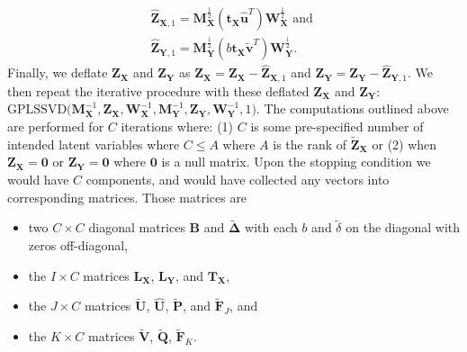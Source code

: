 \documentclass[12pt]{article}
\begin{document}
\begin{equation}
\begin{aligned}
\widehat{\mathbf Z}_{{\mathbf X},1} = {\mathbf M}_{\mathbf X}^{\frac{1}{2}}({\mathbf t}_{\mathbf X}\widehat{\mathbf u}^{T}){\mathbf W}_{\mathbf X}^{\frac{1}{2}} \text{ and } \\
\widehat{\mathbf Z}_{{\mathbf Y},1} = {\mathbf M}_{\mathbf Y}^{\frac{1}{2}}(b{\mathbf t}_{\mathbf X}\widetilde{\mathbf v}^{T}){\mathbf W}_{\mathbf Y}^{\frac{1}{2}}.
\label{eq:rank1_preds_plscar}
\end{aligned}
\end{equation} Finally, we deflate \({\mathbf Z}_{\mathbf X}\) and
\({\mathbf Z}_{\mathbf Y}\) as
\({\mathbf Z}_{\mathbf X} = {\mathbf Z}_{\mathbf X} - \widehat{\mathbf Z}_{{\mathbf X},1}\)
and
\({\mathbf Z}_{\mathbf Y} = {\mathbf Z}_{\mathbf Y} - \widehat{\mathbf Z}_{{\mathbf Y},1}\).
We then repeat the iterative procedure with these deflated
\({\mathbf Z}_{\mathbf X}\) and \({\mathbf Z}_{\mathbf Y}\):
\(\mathrm{GPLSSVD(} {\mathbf M}_{\mathbf X}^{-1}, {\mathbf Z}_{\mathbf X}, {\mathbf W}_{\mathbf X}^{-1}, {\mathbf M}_{\mathbf Y}^{-1}, {\mathbf Z}_{\mathbf Y}, {\mathbf W}_{\mathbf Y}^{-1}, 1 \mathrm{)}\).
The computations outlined above are performed for \(C\) iterations
where: (1) \(C\) is some pre-specified number of intended latent
variables where \(C \leq A\) where \(A\) is the rank of
\(\widetilde{\mathbf Z}_{\mathbf X}\) or (2) when
\({\mathbf Z}_{\mathbf X} = {\mathbf 0}\) or
\({\mathbf Z}_{\mathbf Y} = {\mathbf 0}\) where \({\mathbf 0}\) is a
null matrix. Upon the stopping condition we would have \(C\) components,
and would have collected any vectors into corresponding matrices. Those
matrices are

\begin{itemize}
\item
  two \(C \times C\) diagonal matrices \({\mathbf B}\) and
  \(\widetilde{\boldsymbol \Delta}\) with each \(b\) and
  \(\tilde\delta\) on the diagonal with zeros off-diagonal,
\item
  the \(I \times C\) matrices \({\mathbf L}_{\mathbf X}\),
  \({\mathbf L}_{\mathbf Y}\), and \({\mathbf T}_{\mathbf X}\),
\item
  the \(J \times C\) matrices \(\widetilde{\mathbf U}\),
  \(\widehat{\mathbf U}\), \(\widetilde{\mathbf P}\), and
  \(\widetilde{\mathbf F}_{J}\), and
\item
  the \(K \times C\) matrices \(\widetilde{\mathbf V}\),
  \(\widetilde{\mathbf Q}\), \(\widetilde{\mathbf F}_{K}\).
\end{itemize}
\end{document}
